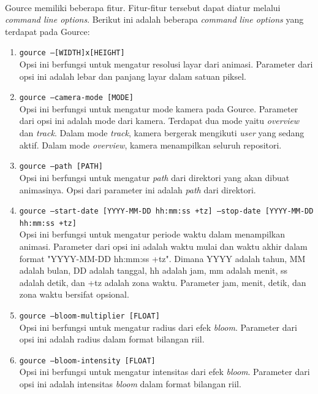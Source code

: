 \ \\
Gource memiliki beberapa fitur. Fitur-fitur tersebut dapat diatur melalui \textit{command line options}. Berikut ini adalah beberapa \textit{command line options} yang terdapat pada Gource:
\begin{enumerate}
\item \texttt{gource --[WIDTH]x[HEIGHT]}\\
Opsi ini berfungsi untuk mengatur resolusi layar dari animasi. Parameter dari opsi ini adalah lebar dan panjang layar dalam satuan piksel. 

\item \texttt{gource --camera-mode [MODE]}\\
Opsi ini berfungsi untuk mengatur mode kamera pada Gource. Parameter dari opsi ini adalah mode dari kamera. Terdapat dua mode yaitu \textit{overview} dan \textit{track}. Dalam mode \textit{track}, kamera bergerak mengikuti \textit{user} yang sedang aktif. Dalam mode \textit{overview}, kamera menampilkan seluruh repositori.

\item \texttt{gource --path [PATH]}\\
Opsi ini berfungsi untuk mengatur \textit{path} dari direktori yang akan dibuat animasinya. Opsi dari parameter ini adalah \textit{path} dari direktori.

\item \texttt{gource --start-date [YYYY-MM-DD hh:mm:ss +tz] --stop-date [YYYY-MM-DD hh:mm:ss +tz]}\\
Opsi ini berfungsi untuk mengatur periode waktu dalam menampilkan animasi. Parameter dari opsi ini adalah waktu mulai dan waktu akhir dalam format "YYYY-MM-DD hh:mm:ss +tz". Dimana YYYY adalah tahun, MM adalah bulan, DD adalah tanggal, hh adalah jam, mm adalah menit, ss adalah detik, dan +tz adalah zona waktu. Parameter jam, menit, detik, dan zona waktu bersifat opsional.    

\item \texttt{gource --bloom-multiplier [FLOAT] }\\
Opsi ini berfungsi untuk mengatur radius dari efek \textit{bloom}. Parameter dari opsi ini adalah radius dalam format bilangan riil.

\item \texttt{gource --bloom-intensity [FLOAT]}\\
Opsi ini berfungsi untuk mengatur intensitas dari efek \textit{bloom}. Parameter dari opsi ini adalah intensitas \textit{bloom} dalam format bilangan riil.


\end{enumerate}
